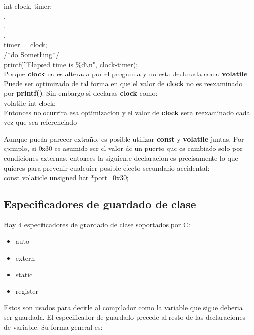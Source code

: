 \documentclass[]{article}
\begin{document}
	int clock, timer;\\
	.\\
	.\\
	.\\
	timer = clock;\\
	/*do Something*/\\
	printf(''Elapsed time is \%d$\backslash$n", clock-timer);\\
	
	Porque \textbf{clock} no es alterada por el programa y no esta declarada como \textbf{volatile} Puede ser optimizado de tal forma en que el valor de \textbf{clock} no es reexaminado por \textbf{printf()}. Sin embargo si declaras \textbf{clock} como:\\
	
	volatile int clock;\\
	
	Entonces no ocurrira esa optimizacion y el valor de \textbf{clock} sera reexaminado cada vez que sea referenciado
	
	Aunque pueda parecer extraño, es posible utilizar \textbf{const} y \textbf{volatile} juntas. Por ejemplo, si 0x30 es asumido ser el valor de un puerto que es cambiado solo por condiciones externas, entonces la siguiente declaracion es precisamente lo que quieres para prevenir cualquier posible efecto secundario accidental:\\
	
	const volatiole unsigned har *port=0x30;\\
	
	\subsection{Especificadores de guardado de clase }
	
	Hay 4 especificadores de guardado de clase soportados por C:
	
	\begin{itemize}
		\item auto
		\item extern
		\item static
		\item register
	\end{itemize}

	Estos son usados para decirle al compilador como la variable que sigue deberia ser guardada. El especificador de guardado precede al resto de las declaraciones de variable. Su forma general es:\\
	
\end{document}
